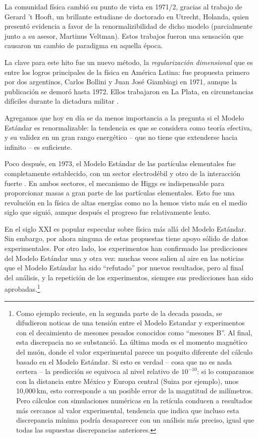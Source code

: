 \documentclass[12pt]{article}
\begin{document}
La comunidad f\'isica cambi\'o su punto de vista en 1971/2, gracias
al trabajo de Gerard 't Hooft, un brillante estudiane de doctorado
en Utrecht, Holanda, quien present\'o evidencia a favor de la
renormalizibilidad de dicho modelo (parcialmente junto a
su asesor, Martinus Veltman). Estos trabajos \cite{tHooft} fueron
una sensaci\'on que causaron un cambio de paradigma en aquella \'epoca.

La clave para este hito fue un nuevo m\'etodo, la {\em regularizaci\'on
dimensional} que es entre los logros principales de la f\'isica en
Am\'erica Latina: fue propuesta primero por dos argentinos, Carlos Bollini
y Juan Jos\'e Giambiagi en 1971, aunque la publicaci\'on \cite{BolGiam}
se demor\'o hasta 1972. Ellos trabajaron en La Plata, en
circunstancias dif\'iciles durante la dictadura militar \cite{DimReg}.

Agregamos que hoy en d\'ia se da menos importancia a la pregunta
si el Modelo Estándar es renormalizable: la tendencia es que se
considera como teor\'ia efectiva, y su validez en un gran rango
energ\'etico -- que no tiene que extenderse hacia infinito --
es suficiente.

Poco despu\'es, en 1973, el Modelo Estándar de las part\'iculas
elementales fue completamente establecido, con un sector
electrod\'ebil \cite{Weinberg,Salam} y otro de la interacci\'on
fuerte \cite{QCD}. En ambos sectores,
el mecanismo de Higgs es indispensable para proporcionar masas
a gran parte de las part\'iculas elementales.
Esto fue una revoluci\'on en la f\'isica de altas energ\'ias como no la
hemos visto m\'as en el medio siglo que sigui\'o, aunque después el progreso
fue relativamente lento.

En el siglo XXI es popular especular sobre f\'isica m\'as all\'a
del Modelo Estándar. Sin embargo, por ahora ninguna de estas propuestas
tiene apoyo sólido de datos experimentales. Por otro lado, los
experimentos han confirmado las predicciones del Modelo Estándar una
y otra vez: muchas veces salien al aire en las noticias que el Modelo Estándar ha sido ``refutado''
por nuevos resultados, pero al final del an\'alisis, y la repetici\'on
de los experimentos, siempre sus predicciones han sido
aprobadas.\footnote{Como ejemplo reciente, en la segunda parte de la
  decada pasada, se difudieron noticas de una tensi\'on entre el Modelo
  Estandar y experimentos con el decaimiento de mesones pesados
  conocidos como ``mesones B''. Al final, esta discrepacia no se
  substanci\'o. La \'ultima moda es el momento magn\'etico del
  muón, donde el valor experimental parece un poquito diferente
  del c\'alculo basado en el Modelo Estándar. Si esto es verdad --
  cosa que no es nada certera -- la predicci\'on se equivoca al
  nivel relativo de $10^{-10}$: si lo comparamos con la distancia
  entre M\'exico y Europa central (Suiza por ejemplo), unos
  10,000\,km, esto corresponde a un posible error de la magntitud
  de milímetros. Pero cálculos con simulaciones num\'ericas
  en la ret\'icula conducen a resultados m\'as cercanos al valor
  experimental, tendencia que indica que incluso esta discrepancia
  m\'inima podr\'ia desaparecer con un an\'alisis m\'as preciso,
  igual que todas las supuestas discrepancias anteriores.}
  
\end{document}

